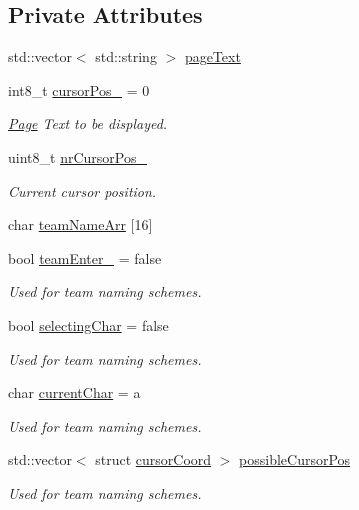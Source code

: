 \subsection*{Private Attributes}
\begin{DoxyCompactItemize}
\item 
std\+::vector$<$ std\+::string $>$ \hyperlink{class_page_acc5caef0eeb95817d30050e985aa3e4f}{page\+Text}
\item 
int8\+\_\+t \hyperlink{class_page_aed4c5e44ec4495ac8f33ae8a55d441e3}{cursor\+Pos\+\_\+} = 0
\begin{DoxyCompactList}\small\item\em \hyperlink{class_page}{Page} Text to be displayed. \end{DoxyCompactList}\item 
uint8\+\_\+t \hyperlink{class_page_a46dc188f2ae533c023cbbde595cb4c7c}{nr\+Cursor\+Pos\+\_\+}
\begin{DoxyCompactList}\small\item\em Current cursor position. \end{DoxyCompactList}\item 
char \hyperlink{class_page_ac354cb7bc8c03459179a5c2c1628d5ed}{team\+Name\+Arr} \mbox{[}16\mbox{]}
\item 
bool \hyperlink{class_page_a34b443eebdb2ae4f0233be759cd725ae}{team\+Enter\+\_\+} = false
\begin{DoxyCompactList}\small\item\em Used for team naming schemes. \end{DoxyCompactList}\item 
bool \hyperlink{class_page_a58f2fd2c2eae4bf594b8e9b8435cf6f0}{selecting\+Char} = false
\begin{DoxyCompactList}\small\item\em Used for team naming schemes. \end{DoxyCompactList}\item 
char \hyperlink{class_page_a807fddcf3944886e052d48fb71888cc9}{current\+Char} = \textquotesingle{}a\textquotesingle{}
\begin{DoxyCompactList}\small\item\em Used for team naming schemes. \end{DoxyCompactList}\item 
std\+::vector$<$ struct \hyperlink{structcursor_coord}{cursor\+Coord} $>$ \hyperlink{class_page_a4d699ca3cdde0ff6325cde57f315b60b}{possible\+Cursor\+Pos}
\begin{DoxyCompactList}\small\item\em Used for team naming schemes. \end{DoxyCompactList}\end{DoxyCompactItemize}


